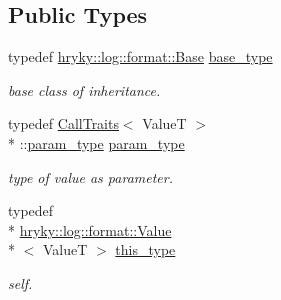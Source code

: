 \subsection*{Public Types}
\begin{DoxyCompactItemize}
\item 
\hypertarget{classhryky_1_1log_1_1format_1_1_value_aa56e3b1658ac2046f5eeaeb04b21e987}{typedef \hyperlink{classhryky_1_1log_1_1format_1_1_base}{hryky\-::log\-::format\-::\-Base} \hyperlink{classhryky_1_1log_1_1format_1_1_value_aa56e3b1658ac2046f5eeaeb04b21e987}{base\-\_\-type}}\label{classhryky_1_1log_1_1format_1_1_value_aa56e3b1658ac2046f5eeaeb04b21e987}

\begin{DoxyCompactList}\small\item\em base class of inheritance. \end{DoxyCompactList}\item 
\hypertarget{classhryky_1_1log_1_1format_1_1_value_a4e6e8d8330ce51833a08aa0aab7586a4}{typedef \hyperlink{classhryky_1_1_call_traits}{Call\-Traits}$<$ Value\-T $>$\\*
\-::\hyperlink{classhryky_1_1log_1_1format_1_1_value_a4e6e8d8330ce51833a08aa0aab7586a4}{param\-\_\-type} \hyperlink{classhryky_1_1log_1_1format_1_1_value_a4e6e8d8330ce51833a08aa0aab7586a4}{param\-\_\-type}}\label{classhryky_1_1log_1_1format_1_1_value_a4e6e8d8330ce51833a08aa0aab7586a4}

\begin{DoxyCompactList}\small\item\em type of value as parameter. \end{DoxyCompactList}\item 
\hypertarget{classhryky_1_1log_1_1format_1_1_value_aea33ef46dadd2f65199e33a9a2107d2e}{typedef \\*
\hyperlink{classhryky_1_1log_1_1format_1_1_value}{hryky\-::log\-::format\-::\-Value}\\*
$<$ Value\-T $>$ \hyperlink{classhryky_1_1log_1_1format_1_1_value_aea33ef46dadd2f65199e33a9a2107d2e}{this\-\_\-type}}\label{classhryky_1_1log_1_1format_1_1_value_aea33ef46dadd2f65199e33a9a2107d2e}

\begin{DoxyCompactList}\small\item\em self. \end{DoxyCompactList}\end{DoxyCompactItemize}
